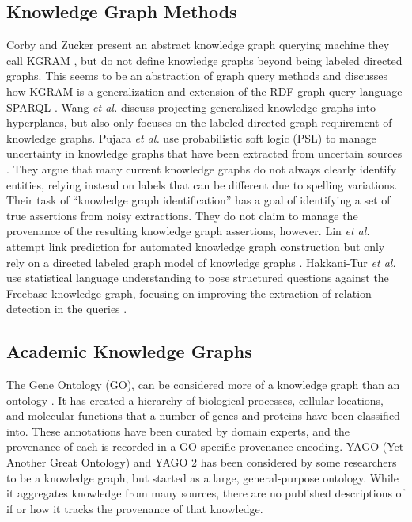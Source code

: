 \subsection{Knowledge Graph Methods}
Corby and Zucker present an abstract knowledge graph querying machine they call KGRAM \cite{Corby_2010}, but do not define knowledge graphs beyond being labeled directed graphs.
This seems to be an abstraction of graph query methods and discusses how KGRAM is a generalization and extension of the RDF graph query language SPARQL \cite{harris2013sparql}.
Wang \emph{et al.} \cite{Wang_knowledgegraph} discuss projecting generalized knowledge graphs into hyperplanes, but also only focuses on the labeled directed graph requirement of knowledge graphs.
Pujara \emph{et al.} use probabilistic soft logic (PSL) to manage uncertainty in knowledge graphs that have been extracted from uncertain sources \cite{Pujara_2013}. 
They argue that many current knowledge graphs do not always clearly identify entities, relying instead on labels that can be different due to spelling variations.
Their task of ``knowledge graph identification'' has a goal of identifying a set of true assertions from noisy extractions.
They do not claim to manage the provenance of the resulting knowledge graph assertions, however.
Lin \emph{et al.} attempt link prediction for automated knowledge graph construction but only rely on a directed labeled graph model of knowledge graphs \cite{lin2015learning}.
Hakkani-Tur \emph{et al.} use statistical language understanding to pose structured questions against the Freebase knowledge graph, focusing on improving the extraction of relation detection in the queries \cite{Hakkani_Tur_2013}.


\subsection{Academic Knowledge Graphs}
The Gene Ontology (GO), can be considered more of a knowledge graph than an ontology \cite{Ashburner_2000}.
It has created a hierarchy of biological processes, cellular locations, and molecular functions that a number of genes and proteins have been classified into.
These annotations have been curated by domain experts, and the provenance of each is recorded in a GO-specific provenance encoding.
YAGO (Yet Another Great Ontology) \cite{Suchanek_2007} and YAGO 2 \cite{Hoffart_2013} has been considered by some researchers to be a knowledge graph, but started as a large, general-purpose ontology.
While it aggregates knowledge from many sources, there are no published descriptions of if or how it tracks the provenance of that knowledge.

